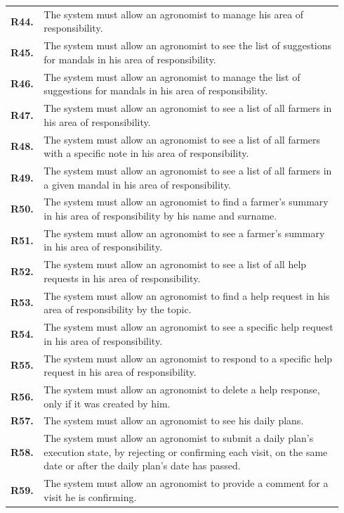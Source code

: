 \begin{longtable}{@{}p{0.06\linewidth} p{0.88\linewidth}}
		\textbf{R44.} & The system must allow an agronomist to manage his area of responsibility.\\
		\textbf{R45.} & The system must allow an agronomist to see the list of suggestions for mandals in his area of responsibility.\\
		\textbf{R46.} & The system must allow an agronomist to manage the list of suggestions for mandals in his area of responsibility.\\
		\textbf{R47.} & The system must allow an agronomist to see a list of all farmers in his area of responsibility.\\
		\textbf{R48.} & The system must allow an agronomist to see a list of all farmers with a specific note in his area of responsibility.\\
		\textbf{R49.} & The system must allow an agronomist to see a list of all farmers in a given mandal in his area of responsibility.\\
		\textbf{R50.} & The system must allow an agronomist to find a farmer's summary in his area of responsibility by his name and surname.\\
		\textbf{R51.} & The system must allow an agronomist to see a farmer's summary in his area of responsibility.\\
		\textbf{R52.} & The system must allow an agronomist to see a list of all help requests in his area of responsibility.\\
		\textbf{R53.} & The system must allow an agronomist to find a help request in his area of responsibility by the topic.\\
		\textbf{R54.} & The system must allow an agronomist to see a specific help request in his area of responsibility.\\
		\textbf{R55.} & The system must allow an agronomist to respond to a specific help request in his area of responsibility.\\
		\textbf{R56.} & The system must allow an agronomist to delete a help response, only if it was created by him.\\
		\textbf{R57.} & The system must allow an agronomist to see his daily plans.\\
		\textbf{R58.} & The system must allow an agronomist to submit a daily plan's execution state, by rejecting or confirming each visit, on the same date or after the daily plan's date has passed. \\
		\textbf{R59.} & The system must allow an agronomist to provide a comment for a visit he is confirming.\\

\end{longtable}
